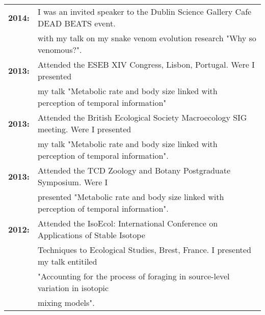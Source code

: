 \documentclass[10pt,a4paper]{article}
\begin{document}
\begin{tabular}{ll}
\textbf{2014:} & I was an invited speaker to the Dublin Science Gallery Cafe DEAD BEATS event.\\ 
& with my talk on my snake venom evolution research "Why so venomous?".\\
\textbf{2013:} & Attended the ESEB XIV Congress, Lisbon, Portugal. Were I presented\\
& my talk "Metabolic rate and body size linked with perception of temporal information"\\
\textbf{2013:} & Attended the British Ecological Society Macroecology SIG meeting. Were I presented\\
&my talk "Metabolic rate and body size linked with perception of temporal information".\\
\textbf{2013:} & Attended the TCD Zoology and Botany Postgraduate Symposium. Were I\\
& presented "Metabolic rate and body size linked with perception of temporal information".\\
\textbf{2012:} & Attended the IsoEcol: International Conference on Applications of Stable Isotope\\
&Techniques to Ecological Studies, Brest, France. I presented my talk entitiled\\
 &"Accounting for the process of foraging in source-level variation in isotopic\\
& mixing models".\\


\end{tabular}

\end{document}
